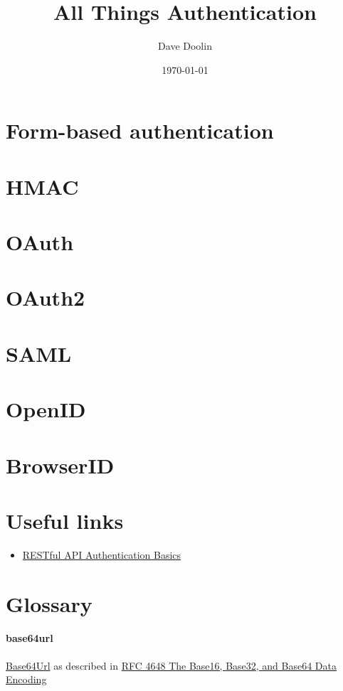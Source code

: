 \documentclass{article}
\title{All Things Authentication}
\date{\today}
\author{Dave Doolin}
\begin{document}
\maketitle
\tableofcontents








\section{Form-based authentication}
\section{HMAC}
\section{OAuth}
\section{OAuth2}
\section{SAML}
\section{OpenID}
\section{BrowserID}

\appendix

\section{Useful links}

\begin{itemize}
  \item \href{https://blog.restcase.com/restful-api-authentication-basics/}{%
      RESTful API Authentication Basics}
\end{itemize}

\section{Glossary}

\paragraph{base64url} \href{https://en.wikipedia.org/wiki/Base64#URL_applications}{%
  Base64Url} as described in \href{https://tools.ietf.org/html/rfc4648}{%
    RFC 4648 The Base16, Base32, and Base64 Data Encoding}
\end{document}
